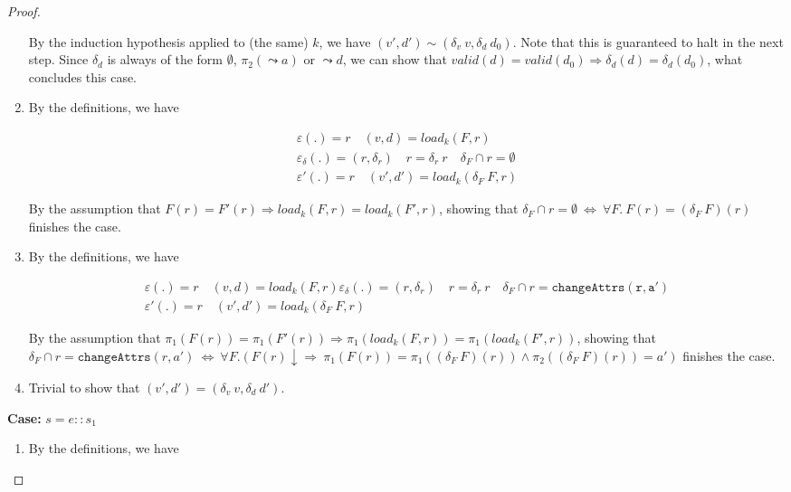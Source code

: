 \documentclass[10pt,twoside,a4paper]{article}
\theoremstyle{theorem}
\theoremstyle{lemma}
\theoremstyle{property}
\def\fst{\pi_1}
\def\snd{\pi_2}
\begin{document}
\begin{proof}
\begin{enumerate}
	By the induction hypothesis applied to (the same) $k$, we have $(v',d') \sim (\delta_v ~ v,\delta_d ~ d_0)$. Note that this is guaranteed to halt in the next step.
	Since $\delta_d$ is always of the form $\emptyset$, $\pi_2 (\leadsto a)$ or $\leadsto d$, we can show that $valid(d) = valid(d_0) \Rightarrow \delta_d(d) = \delta_d(d_0)$, what concludes this case.
	
		\item
		By the definitions, we have

		\begin{align*}
			\varepsilon(.) = r \quad
			(v,d) = load_k (F,r)\\
			\varepsilon_\delta(.) = (r,\delta_r) \quad r = \delta_r ~ r \quad
			\delta_F \cap r = \emptyset\\
			\varepsilon'(.) = r \quad
			(v',d') = load_k (\delta_F ~ F,r)
		\end{align*}

		By the assumption that $F(r) = F'(r) \Rightarrow load_k(F,r) = load_k(F',r)$, showing that $\delta_F \cap r = \emptyset ~\Leftrightarrow~ \forall F.~F(r) = (\delta_F~F)(r)$ finishes the case.

		\item
		By the definitions, we have
		
		\begin{align*}
			\varepsilon(.) = r \quad
			(v,d) = load_k (F,r)
			\varepsilon_\delta(.) = (r,\delta_r) \quad r = \delta_r ~ r \quad
			\delta_F \cap r = \mathtt{changeAttrs(r,a')}\\
			\varepsilon'(.) = r \quad
			(v',d') = load_k (\delta_F ~ F,r)
		\end{align*}
		
		By the assumption that $\fst(F(r)) = \fst(F'(r)) \Rightarrow \fst(load_k(F,r)) = \fst(load_k(F',r))$, showing that $\delta_F \cap r = \mathtt{changeAttrs}(r,a') ~\Leftrightarrow~ \forall F. (F(r)\downarrow \Rightarrow ~\fst(F(r)) = \fst((\delta_F~F)(r)) \wedge \snd((\delta_F~F)(r)) = a')$ finishes the case.
		
		\item
		Trivial to show that $(v',d') = (\delta_v ~ v,\delta_d ~ d')$.
	\end{enumerate}
	
	
	\textbf{Case: } $s = e :: s_1$\\
	\begin{enumerate}
		\item
		By the definitions, we have
		

\end{enumerate}
\end{proof}
\end{document}
